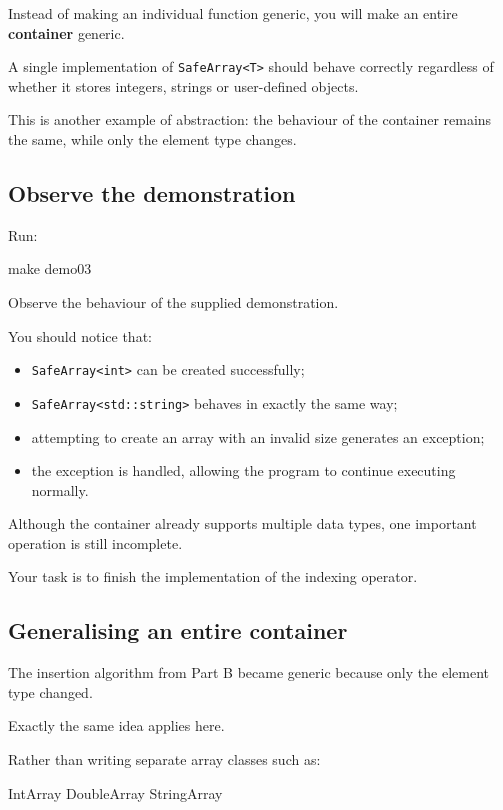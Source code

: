 \documentclass{csc2059practical}
\begin{document}
Instead of making an individual function generic, you will make an entire \textbf{container} generic.

A single implementation of \texttt{SafeArray<T>} should behave correctly regardless of whether it stores integers, strings or user-defined objects.

This is another example of abstraction: the behaviour of the container remains the same, while only the element type changes.

\subsection{Observe the demonstration}

Run:

\begin{terminal}
make demo03
\end{terminal}

Observe the behaviour of the supplied demonstration.

You should notice that:

\begin{itemize}
    \item \texttt{SafeArray<int>} can be created successfully;
    \item \texttt{SafeArray<std::string>} behaves in exactly the same way;
    \item attempting to create an array with an invalid size generates an exception;
    \item the exception is handled, allowing the program to continue executing normally.
\end{itemize}

Although the container already supports multiple data types, one important operation is still incomplete.

Your task is to finish the implementation of the indexing operator.

\subsection{Generalising an entire container}

The insertion algorithm from Part B became generic because only the element type changed.

Exactly the same idea applies here.

Rather than writing separate array classes such as:

\begin{cppcode}
IntArray
DoubleArray
StringArray
\end{cppcode}
\end{document}
